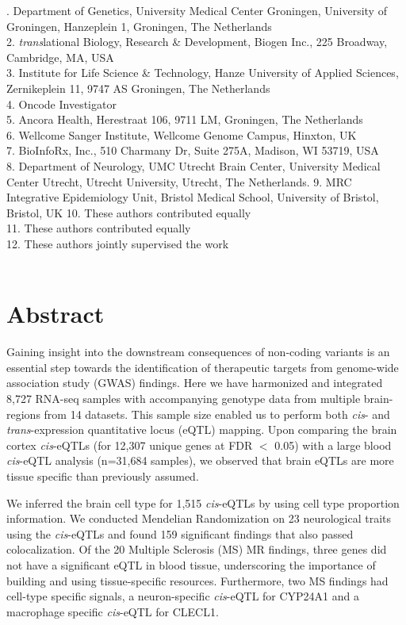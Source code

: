 . Department of Genetics, University Medical Center Groningen, University of Groningen, Hanzeplein 1, Groningen, The Netherlands \\
2. \textit{trans}lational Biology, Research \& Development, Biogen Inc., 225 Broadway, Cambridge, MA, USA \\
3. Institute for Life Science \& Technology, Hanze University of Applied Sciences, Zernikeplein 11, 9747 AS Groningen, The Netherlands \\
4. Oncode Investigator \\
5. Ancora Health, Herestraat 106, 9711 LM, Groningen, The Netherlands \\
6. Wellcome Sanger Institute, Wellcome Genome Campus, Hinxton, UK \\
7. BioInfoRx, Inc., 510 Charmany Dr, Suite 275A, Madison, WI 53719, USA \\
8. Department of Neurology, UMC Utrecht Brain Center, University Medical Center Utrecht, Utrecht University, Utrecht, The Netherlands.
9. MRC Integrative Epidemiology Unit, Bristol Medical School, University of Bristol, Bristol, UK
10. These authors contributed equally \\
11. These authors contributed equally \\
12. These authors jointly supervised the work 
\\
\\

\newpage

\section*{Abstract}
Gaining insight into the downstream consequences of non-coding variants is an essential step towards the identification of therapeutic targets from genome-wide association study (GWAS) findings.  Here we have harmonized and integrated 8,727 RNA-seq samples with accompanying genotype data from multiple brain-regions from 14 datasets. This sample size enabled us to perform both \textit{cis}- and \textit{trans}-expression quantitative locus (eQTL) mapping. Upon comparing the brain cortex \textit{cis}-eQTLs (for 12,307 unique genes at FDR $<$ 0.05) with a large blood \textit{cis}-eQTL analysis (n=31,684 samples), we observed that brain eQTLs are more tissue specific than previously assumed. 

We inferred the brain cell type for 1,515 \textit{cis}-eQTLs by using cell type proportion information. We conducted Mendelian Randomization on 23 neurological traits using the \textit{cis}-eQTLs and found 159 significant findings that also passed colocalization. Of the 20 Multiple Sclerosis (MS) MR findings, three genes did not have a significant eQTL in blood tissue, underscoring the importance of building and using tissue-specific resources. Furthermore, two MS findings had cell-type specific signals, a neuron-specific \textit{cis}-eQTL for CYP24A1 and a macrophage specific \textit{cis}-eQTL for CLECL1.  


